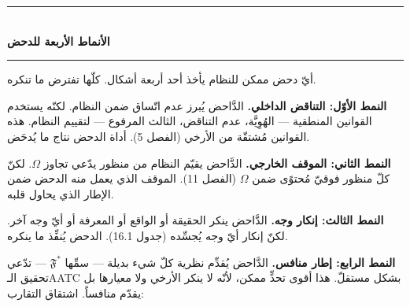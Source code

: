 \documentclass[10pt, openany, oneside]{book}
\renewcommand{\normalsize}{\fontsize{10}{13}\selectfont}
\begin{document}
\vspace{1.5em}


\begin{center}
    \rule{0.3\textwidth}{0.4pt}\\[0.5em]
    {\normalsize\bfseries الأنماط الأربعة للدحض}\\[0.3em]
    \rule{0.3\textwidth}{0.4pt}
\end{center}

\vspace{1em}

\noindent أيّ دحض ممكن للنظام يأخذ أحد أربعة أشكال. كلّها تفترض ما تنكره.

\textbf{النمط الأوّل: التناقض الداخلي.} الدَّاحض يُبرز عدم اتّساق ضمن النظام. لكنّه يستخدم القوانين المنطقية --- الهُوِيَّة، عدم التناقض، الثالث المرفوع --- لتقييم النظام. هذه القوانين مُشتقّة من الأرخي (الفصل 5). أداة الدحض نتاج ما يُدحَض.

\textbf{النمط الثاني: الموقف الخارجي.} الدَّاحض يقيّم النظام من منظور يدّعي تجاوز $\Omega$. لكنّ كلّ منظور فوقيّ مُحتوًى ضمن $\Omega$ (الفصل 11). الموقف الذي يعمل منه الدحض ضمن الإطار الذي يحاول قلبه.

\textbf{النمط الثالث: إنكار وجه.} الدَّاحض ينكر الحقيقة أو الواقع أو المعرفة أو أيّ وجه آخر. لكنّ إنكار أيّ وجه يُجسِّده (جدول 16.1). الدحض يُنفِّذ ما ينكره.

\textbf{النمط الرابع: إطار منافس.} الدَّاحض يُقدِّم نظرية كلّ شيء بديلة --- سمِّها $\mathfrak{F}^*$ --- تدّعي تحقيق الـAATC بشكل مستقلّ. هذا أقوى تحدٍّ ممكن، لأنّه لا ينكر الأرخي ولا معيارها بل يقدّم منافساً. اشتقاق التقارب:

\vspace{0.5em}
\end{document}
